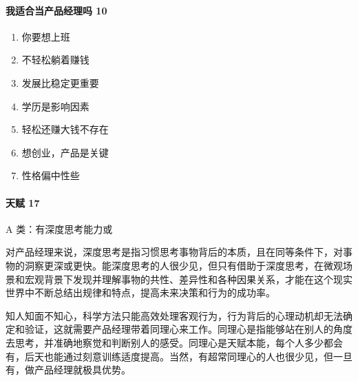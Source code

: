 \documentclass[letterpaper,10pt,english]{sphinxmanual}
\begin{document}
\paragraph{我适合当产品经理吗 10\sphinxfootnotemark[202]}
\label{\detokenize{chapter_introduction/PM:id54}}%
\begin{footnotetext}[202]\sphinxAtStartFootnote
{}
%
\end{footnotetext}\ignorespaces \begin{enumerate}
%
\item {} 
你要想上班

\item {} 
不轻松躺着赚钱

\item {} 
发展比稳定更重要

\item {} 
学历是影响因素

\item {} 
轻松还赚大钱不存在

\item {} 
想创业，产品是关键

\item {} 
性格偏中性些

\end{enumerate}


\paragraph{天赋 17\sphinxfootnotemark[203]}
\label{\detokenize{chapter_introduction/PM:id55}}%
\begin{footnotetext}[203]\sphinxAtStartFootnote
{}
%
\end{footnotetext}\ignorespaces 
A 类：有深度思考能力或

对产品经理来说，深度思考是指习惯思考事物背后的本质，且在同等条件下，对事物的洞察更深或更快。能深度思考的人很少见，但只有借助于深度思考，在微观场景和宏观背景下发现并理解事物的共性、差异性和各种因果关系，才能在这个现实世界中不断总结出规律和特点，提高未来决策和行为的成功率。

知人知面不知心，科学方法只能高效处理客观行为，行为背后的心理动机却无法确定和验证，这就需要产品经理带着同理心来工作。同理心是指能够站在别人的角度去思考，并准确地察觉和判断别人的感受。同理心是天赋本能，每个人多少都会有，后天也能通过刻意训练适度提高。当然，有超常同理心的人也很少见，但一旦有，做产品经理就极具优势。
\end{document}
